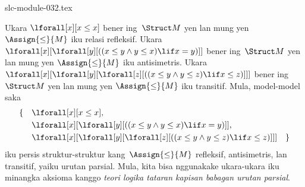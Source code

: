 \begin{filecontents*}[overwrite]{slc-module-032.tex}
\begin{ex}
Ukara $\lforall[x][x \le x]$ bener ing~$\Struct M$
yen lan mung yen $\Assign{\le}{M}$ iku relasi refleksif.
Ukara
$\lforall[x][\lforall[y][((x \le y \land y \le x) \lif x = y)]]$
bener ing~$\Struct M$ yen lan mung yen $\Assign{\le}{M}$
iku antisimetris. Ukara
$\lforall[x][\lforall[y][\lforall[z][((x \le y \land y \le z)
      \lif x \le z)]]]$ bener ing~$\Struct M$ yen lan
mung yen $\Assign{\le}{M}$ iku transitif. Mula, model-model saka
\begin{align*}
\{\quad &\lforall[x][x \le x], \\
   & \lforall[x][\lforall[y][((x \le y \land y \le
    x) \lif x = y)]], \\
   &\lforall[x][\lforall[y][\lforall[z][((x \le y
      \land y \le z) \lif x \le z)]]] \quad \}
\end{align*}
iku persis struktur-struktur kang~$\Assign{\le}{M}$ refleksif,
antisimetris, lan transitif, yaiku urutan parsial. Mula,
kita bisa nggunakake ukara-ukara iku minangka aksioma
kanggo \emph{teori logika tataran kapisan babagan urutan parsial}.
\end{ex}


\end{filecontents*}

